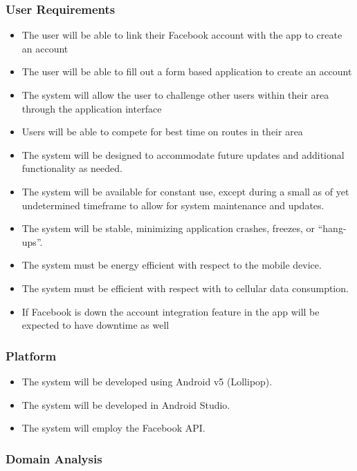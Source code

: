 \documentclass{article}
\begin{document}
\subsubsection{User Requirements}
\begin{itemize}
    \item The user will be able to link their Facebook account with the app to create an account
    \item The user will be able to fill out a form based application to create an account
    \item The system will allow the user to challenge other users within their area through the application interface
    \item Users will be able to compete for best time on routes in their area
    \item The system will be designed to accommodate future updates and additional functionality as needed.
    \item The system will be available for constant use, except during a small as of yet undetermined timeframe to allow for system maintenance and updates.
    \item The system will be stable, minimizing application crashes, freezes, or “hang-ups”.
    \item The system must be energy efficient with respect to the mobile device.
    \item The system must be efficient with respect with to cellular data consumption.
    \item If Facebook is down the account integration feature in the app will be expected to have downtime as well

\end{itemize}

\subsubsection{Platform}
\begin{itemize}
    \item The system will be developed using Android v5 (Lollipop).
    \item The system will be developed in Android Studio.
    \item The system will employ the Facebook API.
\end{itemize}

\subsubsection{Domain Analysis}
\end{document}
